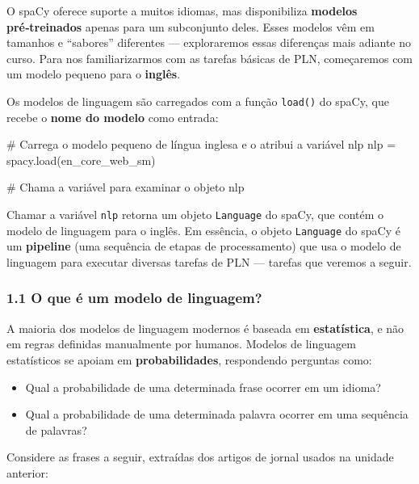 \documentclass[
  brazilian,
  11pt,
]{article}
\newenvironment{Shaded}{\begin{snugshade}}{\end{snugshade}}
\newcommand{\CommentTok}[1]{\textcolor[rgb]{0.48,0.49,0.49}{#1}}
\newcommand{\NormalTok}[1]{\textcolor[rgb]{0.81,0.81,0.76}{#1}}
\newcommand{\OperatorTok}[1]{\textcolor[rgb]{0.81,0.81,0.76}{#1}}
\newcommand{\StringTok}[1]{\textcolor[rgb]{0.96,0.31,0.31}{#1}}
\providecommand{\tightlist}{%
  \setlength{\itemsep}{0pt}\setlength{\parskip}{0pt}}
\let\oldtexttt\texttt
\renewcommand{\texttt}[1]{{\color{inlink}\oldtexttt{#1}}}
\begin{document}
O spaCy oferece suporte a muitos idiomas, mas disponibiliza
\textbf{modelos pré‑treinados} apenas para um subconjunto deles. Esses
modelos vêm em tamanhos e ``sabores'' diferentes --- exploraremos essas
diferenças mais adiante no curso. Para nos familiarizarmos com as
tarefas básicas de PLN, começaremos com um modelo pequeno para o
\textbf{inglês}.

Os modelos de linguagem são carregados com a função \texttt{load()} do
spaCy, que recebe o \textbf{nome do modelo} como entrada:

\begin{Shaded}
\begin{Highlighting}[]
\CommentTok{\# Carrega o modelo pequeno de língua inglesa e o atribui a variável \textquotesingle{}nlp\textquotesingle{}}
\NormalTok{nlp }\OperatorTok{=}\NormalTok{ spacy.load(}\StringTok{\textquotesingle{}en\_core\_web\_sm\textquotesingle{}}\NormalTok{)}

\CommentTok{\# Chama a variável para examinar o objeto}
\NormalTok{nlp}
\end{Highlighting}
\end{Shaded}

Chamar a variável \texttt{nlp} retorna um objeto \texttt{Language} do
spaCy, que contém o modelo de linguagem para o inglês. Em essência, o
objeto \texttt{Language} do spaCy é um \textbf{pipeline} (uma sequência
de etapas de processamento) que usa o modelo de linguagem para executar
diversas tarefas de PLN --- tarefas que veremos a seguir.

\subsubsection{1.1 O que é um modelo de
linguagem?}\label{o-que-uxe9-um-modelo-de-linguagem}

A maioria dos modelos de linguagem modernos é baseada em
\textbf{estatística}, e não em regras definidas manualmente por humanos.
Modelos de linguagem estatísticos se apoiam em \textbf{probabilidades},
respondendo perguntas como:

\begin{itemize}
\tightlist
\item
  Qual a probabilidade de uma determinada frase ocorrer em um idioma?
\item
  Qual a probabilidade de uma determinada palavra ocorrer em uma
  sequência de palavras?
\end{itemize}

Considere as frases a seguir, extraídas dos artigos de jornal usados na
unidade anterior:
\end{document}
